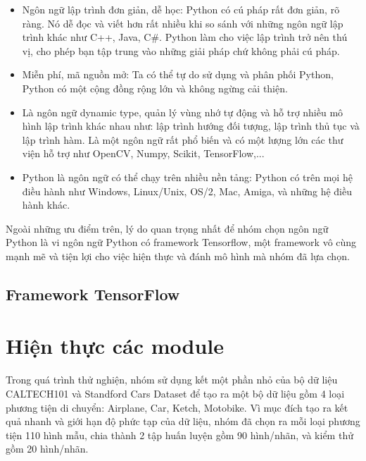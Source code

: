 \documentclass[a4paper,14pt]{extreport}
\begin{document}
\begin{itemize}
        \item Ngôn ngữ lập trình đơn giản, dễ học: Python có cú pháp rất đơn giản, rõ ràng. Nó dễ đọc và viết hơn rất nhiều khi so sánh với những ngôn ngữ lập trình khác như C++, Java, C#. Python làm cho việc lập trình trở nên thú vị, cho phép bạn tập trung vào những giải pháp chứ không phải cú pháp.
        \item Miễn phí, mã nguồn mở: Ta có thể tự do sử dụng và phân phối Python, Python có một cộng đồng rộng lớn và không ngừng cải thiện.
        \item Là ngôn ngữ dynamic type, quản lý vùng nhớ tự động và hỗ trợ nhiều mô hình lập trình khác nhau như: lập trình hướng đối tượng, lập trình thủ tục và lập trình hàm. Là một ngôn ngữ rất phổ biến và có một lượng lớn các thư viện hỗ trợ như OpenCV, Numpy, Scikit, TensorFlow,...
        \item Python là ngôn ngữ có thể chạy trên nhiều nền tảng: Python có trên mọi hệ điều hành như Windows, Linux/Unix, OS/2, Mac, Amiga, và những hệ điều hành khác.
\end{itemize}

Ngoài những ưu điểm trên, lý do quan trọng nhất để nhóm chọn ngôn ngữ Python là vi ngôn ngữ Python có framework Tensorflow, một framework vô cùng mạnh mẽ và tiện lợi cho việc hiện thực và đánh mô hình mà nhóm đã lựa chọn.

\subsection{Framework TensorFlow}



\section{Hiện thực các module}
Trong quá trình thử nghiện, nhóm sử dụng kết một phần nhỏ của bộ dữ liệu CALTECH101 và Standford Cars Dataset để tạo ra một bộ dữ liệu gồm 4 loại phương tiện di chuyển: Airplane, Car, Ketch, Motobike. Vì mục đích tạo ra kết quả nhanh và giới hạn độ phức tạp của dữ liệu, nhóm đã chọn ra mỗi loại phương tiện 110 hình mẫu, chia thành 2 tập huấn luyện gồm 90 hình/nhãn, và kiểm thử gồm 20 hình/nhãn.
\end{document}
